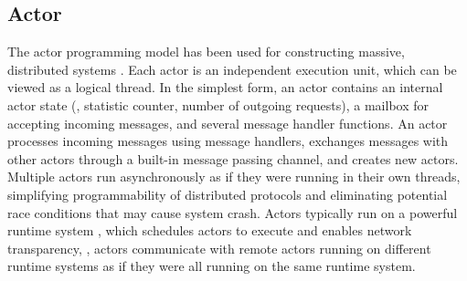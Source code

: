 




\subsection{Actor}

The actor programming model has been used for constructing massive, distributed systems \cite{actor-wiki, akka, newell2016optimizing, AnalysisActor}. Each actor is an independent execution unit, which can be viewed as a logical thread. In the simplest form, an actor contains an internal actor state (\eg, statistic counter, number of outgoing requests), a mailbox for accepting incoming messages, and several message handler functions. An actor processes incoming messages using message handlers, exchanges messages with other actors through a built-in message passing channel, and creates new actors. %
Multiple actors run asynchronously %
 as if they were running in their own threads, simplifying programmability of distributed protocols and eliminating potential race conditions that may cause system crash.
Actors typically run on a powerful runtime system \cite{erlang, akka, caf}, which schedules actors to execute and enables network transparency, \ie, actors communicate with remote actors running on different runtime systems as if they were all running on the same runtime system.


